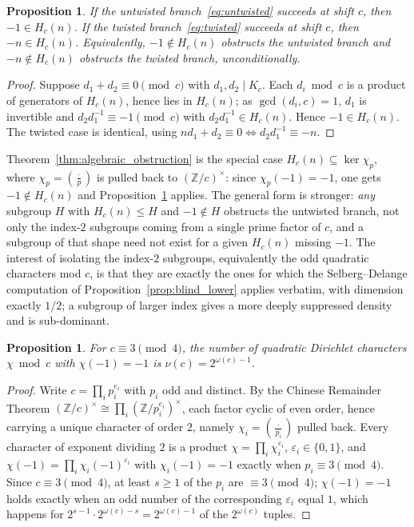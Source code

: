 \documentclass[11pt, a4paper]{article}
\theoremstyle{plain}
\newtheorem{proposition}[theorem]{Proposition}
\theoremstyle{definition}
\newcommand{\Z}{\mathbb{Z}}
\newcommand{\leg}[2]{\left(\frac{#1}{#2}\right)}
\begin{document}
\begin{proposition}\label{prop:subgroup_reformulation}
If the untwisted branch~\eqref{eq:untwisted} succeeds at shift $c$, then $-1\in H_c(n)$. If the twisted branch~\eqref{eq:twisted} succeeds at shift $c$, then $-n\in H_c(n)$. Equivalently, $-1\notin H_c(n)$ obstructs the untwisted branch and $-n\notin H_c(n)$ obstructs the twisted branch, unconditionally.
\end{proposition}
\begin{proof}
Suppose $d_1+d_2\equiv0\pmod c$ with $d_1,d_2\mid K_c$. Each $d_i\bmod c$ is a product of generators of $H_c(n)$, hence lies in $H_c(n)$; as $\gcd(d_i,c)=1$, $d_1$ is invertible and $d_2d_1^{-1}\equiv-1\pmod c$ with $d_2d_1^{-1}\in H_c(n)$. Hence $-1\in H_c(n)$. The twisted case is identical, using $nd_1+d_2\equiv0\iff d_2d_1^{-1}\equiv-n$.
\end{proof}

Theorem~\ref{thm:algebraic_obstruction} is the special case $H_c(n)\subseteq\ker\chi_p$, where $\chi_p=\leg{\cdot}{p}$ is pulled back to $(\Z/c)^{\times}$: since $\chi_p(-1)=-1$, one gets $-1\notin H_c(n)$ and Proposition~\ref{prop:subgroup_reformulation} applies. The general form is stronger: \emph{any} subgroup $H$ with $H_c(n)\le H$ and $-1\notin H$ obstructs the untwisted branch, not only the index-$2$ subgroups coming from a single prime factor of $c$, and a subgroup of that shape need not exist for a given $H_c(n)$ missing $-1$. The interest of isolating the index-$2$ subgroups, equivalently the odd quadratic characters mod $c$, is that they are exactly the ones for which the Selberg--Delange computation of Proposition~\ref{prop:blind_lower} applies verbatim, with dimension exactly $1/2$; a subgroup of larger index gives a more deeply suppressed density and is sub-dominant.

\begin{proposition}\label{prop:nu_c}
For $c\equiv3\pmod4$, the number of quadratic Dirichlet characters $\chi\bmod c$ with $\chi(-1)=-1$ is $\nu(c)=2^{\omega(c)-1}$.
\end{proposition}
\begin{proof}
Write $c=\prod_i p_i^{e_i}$ with $p_i$ odd and distinct. By the Chinese Remainder Theorem $(\Z/c)^{\times}\cong\prod_i(\Z/p_i^{e_i})^{\times}$, each factor cyclic of even order, hence carrying a unique character of order $2$, namely $\chi_i=\leg{\cdot}{p_i}$ pulled back. Every character of exponent dividing $2$ is a product $\chi=\prod_i\chi_i^{\varepsilon_i}$, $\varepsilon_i\in\{0,1\}$, and $\chi(-1)=\prod_i\chi_i(-1)^{\varepsilon_i}$ with $\chi_i(-1)=-1$ exactly when $p_i\equiv3\pmod4$. Since $c\equiv3\pmod4$, at least $s\ge1$ of the $p_i$ are $\equiv3\pmod4$; $\chi(-1)=-1$ holds exactly when an odd number of the corresponding $\varepsilon_i$ equal $1$, which happens for $2^{s-1}\cdot2^{\omega(c)-s}=2^{\omega(c)-1}$ of the $2^{\omega(c)}$ tuples.
\end{proof}
\end{document}
